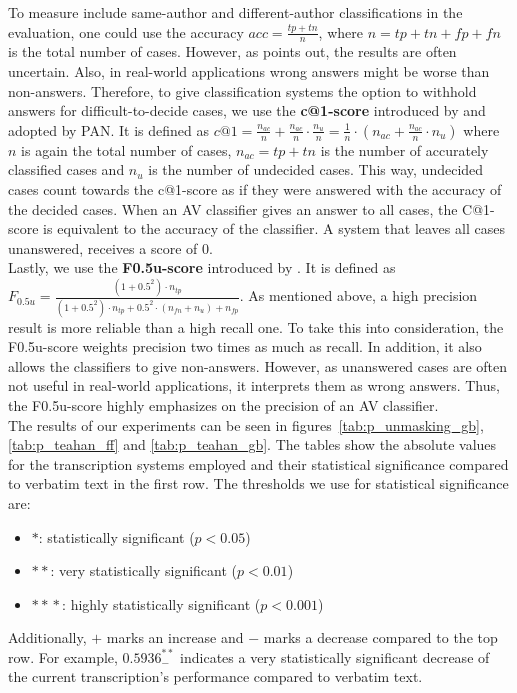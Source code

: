 To measure include same-author and different-author classifications in the evaluation, one could use the accuracy $acc = \frac{tp+tn}{n}$, where $n = tp+tn+fp+fn$ is the total number of cases.
However, as \cite{bevendorff2019unmaskingShortTexts} points out, the results are often uncertain.
Also, in real-world applications wrong answers might be worse than non-answers.
Therefore, to give classification systems the option to withhold answers for difficult-to-decide cases, we use the \textbf{c@1-score} introduced by \cite{penas2011c_at_1} and adopted by PAN.
It is defined as $c@1 = \frac{n_{ac}}{n}+\frac{n_{ac}}{n}\cdot{}\frac{n_u}{n} = \frac{1}{n}\cdot{}\left(n_{ac}+\frac{n_{ac}}{n}\cdot{}n_u\right)$ where $n$ is again the total number of cases, $n_{ac} = tp+tn$ is the number of accurately classified cases and $n_u$ is the number of undecided cases.
This way, undecided cases count towards the c@1-score as if they were answered with the accuracy of the decided cases.
When an AV classifier gives an answer to all cases, the C@1-score is equivalent to the accuracy of the classifier.
A system that leaves all cases unanswered, receives a score of 0.\\
Lastly, we use the \textbf{F0.5u-score} introduced by \cite{bevendorff2019unmaskingShortTexts}.
It is defined as $F_{0.5u} = \frac{(1+0.5^2)\cdot{}n_{tp}}{(1+0.5^2)\cdot{}n_{tp}+0.5^2\cdot{}(n_{fn}+n_u)+n_{fp}}$.
As mentioned above, a high precision result is more reliable than a high recall one.
To take this into consideration, the F0.5u-score weights precision two times as much as recall.
In addition, it also allows the classifiers to give non-answers.
However, as unanswered cases are often not useful in real-world applications, it interprets them as wrong answers.
Thus, the F0.5u-score highly emphasizes on the precision of an AV classifier.\\



The results of our experiments can be seen in figures~\ref{tab:p_unmasking_gb}, \ref{tab:p_teahan_ff} and \ref{tab:p_teahan_gb}.
The tables show the absolute values for the transcription systems employed and their statistical significance compared to verbatim text in the first row.
The thresholds we use for statistical significance are:
\begin{itemize}
    \item $*$: statistically significant ($p < 0.05$)
    \item $*\! *$: very statistically significant ($p < 0.01$)
    \item $*\! *\! *$: highly statistically significant ($p < 0.001$)
\end{itemize}
Additionally, $+$ marks an increase and $-$ marks a decrease compared to the top row.
For example, $0.5936^{*\! *}_{-}$ indicates a very statistically significant decrease of the current transcription's performance compared to verbatim text.


